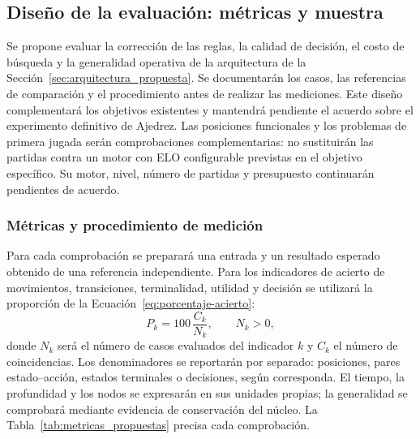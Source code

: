 \subsection{Diseño de la evaluación: métricas y muestra}
\label{subsec:evaluacion_propuesta}

Se propone evaluar la corrección de las reglas, la calidad de decisión, el costo de búsqueda y la generalidad operativa de la arquitectura de la Sección~\ref{sec:arquitectura_propuesta}. Se documentarán los casos, las referencias de comparación y el procedimiento antes de realizar las mediciones. Este diseño complementará los objetivos existentes y mantendrá pendiente el acuerdo sobre el experimento definitivo de Ajedrez. Las posiciones funcionales y los problemas de primera jugada serán comprobaciones complementarias: no sustituirán las partidas contra un motor con ELO configurable previstas en el objetivo específico. Su motor, nivel, número de partidas y presupuesto continuarán pendientes de acuerdo.

\subsubsection{Métricas y procedimiento de medición}

Para cada comprobación se preparará una entrada y un resultado esperado obtenido de una referencia independiente. Para los indicadores de acierto de movimientos, transiciones, terminalidad, utilidad y decisión se utilizará la proporción de la Ecuación~\eqref{eq:porcentaje-acierto}:
\begin{equation}
    P_k = 100\,\frac{C_k}{N_k}, \qquad N_k > 0,
    \label{eq:porcentaje-acierto}
\end{equation}
donde $N_k$ será el número de casos evaluados del indicador $k$ y $C_k$ el número de coincidencias. Los denominadores se reportarán por separado: posiciones, pares estado--acción, estados terminales o decisiones, según corresponda. El tiempo, la profundidad y los nodos se expresarán en sus unidades propias; la generalidad se comprobará mediante evidencia de conservación del núcleo. La Tabla~\ref{tab:metricas_propuestas} precisa cada comprobación.

